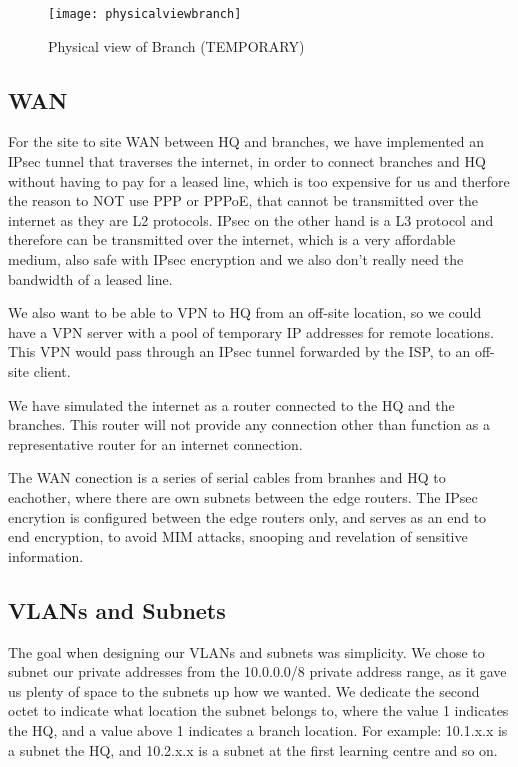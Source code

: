 \begin{figure}[H]
\caption{Physical view of Branch (TEMPORARY)}
\centreing
\texttt{[image: physicalviewbranch]}
\label{physicalviewbranch}
\end{figure}


\subsection{WAN}

For the site to site WAN between HQ and branches, we have implemented an IPsec tunnel that traverses the internet, in order to connect branches and HQ without having to pay for a leased line, which is too expensive for us and therfore the reason to NOT use PPP or PPPoE, that cannot be transmitted over the internet as they are L2 protocols. IPsec on the other hand is a L3 protocol and therefore can be transmitted over the internet, which is a very affordable medium, also safe with IPsec encryption and we also don't really need the bandwidth of a leased line.

We also want to be able to VPN to HQ from an off-site location, so we could have a VPN server with a pool of temporary IP addresses for remote locations. This VPN would pass through an IPsec tunnel forwarded by the ISP, to an off-site client.

We have simulated the internet as a router connected to the HQ and the branches. This router will not provide any connection other than function as a representative router for an internet connection. 

The WAN conection is a series of serial cables from branhes and HQ to eachother, where there are own subnets between the edge routers. The IPsec encrytion is configured between the edge routers only, and serves as an end to end encryption, to avoid MIM attacks, snooping and revelation of sensitive information.

\subsection{VLANs and Subnets}

The goal when designing our VLANs and subnets was simplicity. We chose to subnet our private addresses from the 10.0.0.0/8 private address range, as it gave us plenty of space to the subnets up how we wanted.
We dedicate the second octet to indicate what location the subnet belongs to, where the value 1 indicates the HQ, and a value above 1 indicates a branch location. For example: 10.1.x.x is a subnet the HQ, and 10.2.x.x is a subnet at the first learning centre and so on.

